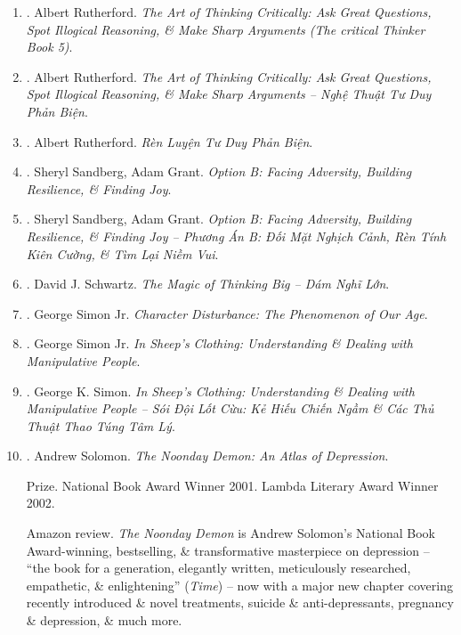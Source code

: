 \documentclass{article}
\begin{document}
\begin{enumerate}
	\item \cite{Rutherford_critical_thinking}. Albert Rutherford. {\it The Art of Thinking Critically: Ask Great Questions, Spot Illogical Reasoning, \& Make Sharp Arguments (The critical Thinker Book 5)}.

	\item \cite{Rutherford_practice_critical_thinking_VN}. Albert Rutherford. {\it The Art of Thinking Critically: Ask Great Questions, Spot Illogical Reasoning, \& Make Sharp Arguments -- Nghệ Thuật Tư Duy Phản Biện}.\hfill{\sf[done]}

	\item \cite{Rutherford_practice_critical_thinking_VN}. Albert Rutherford. {\it Rèn Luyện Tư Duy Phản Biện}.\hfill{\sf[done]}

	\item \cite{Sandberg_Grant2017}. Sheryl Sandberg, Adam Grant. {\it Option B: Facing Adversity, Building Resilience, \& Finding Joy}.\hfill{\sf[reading]}

	\item \cite{Sandberg_Grant2019}. Sheryl Sandberg, Adam Grant. {\it Option B: Facing Adversity, Building Resilience, \& Finding Joy -- Phương Án B: Đối Mặt Nghịch Cảnh, Rèn Tính Kiên Cường, \& Tìm Lại Niềm Vui}.\hfill{\sf[done]}

	\item \cite{Schwartz2019}. David J. Schwartz. {\it The Magic of Thinking Big -- Dám Nghĩ Lớn}.\hfill{\sf[done]}

	\item \cite{Simon_character}. George Simon Jr. {\it Character Disturbance: The Phenomenon of Our Age}.\hfill{\sf[done]}

	\item \cite{Simon_sheep}. George Simon Jr. {\it In Sheep's Clothing: Understanding \& Dealing with Manipulative People}.\hfill{\sf[reading]}

	\item \cite{Simon_sheep_VN}. George K. Simon. {\it In Sheep's Clothing: Understanding \& Dealing with Manipulative People -- Sói Đội Lốt Cừu: Kẻ Hiếu Chiến Ngầm \& Các Thủ Thuật Thao Túng Tâm Lý}.\hfill{\sf[done]}

	\item \cite{Solomon_depression}. {\sc Andrew Solomon}. {\it The Noonday Demon: An Atlas of Depression}.\hfill{\sf[reading]}

	{\sf Prize.} National Book Award Winner 2001. Lambda Literary Award Winner 2002.

	{\sf Amazon review.} {\it The Noonday Demon} is {\sc Andrew Solomon}'s National Book Award-winning, bestselling, \& transformative masterpiece on depression -- ``the book for a generation, elegantly written, meticulously researched, empathetic, \& enlightening'' ({\it Time}) -- now with a major new chapter covering recently introduced \& novel treatments, suicide \& anti-depressants, pregnancy \& depression, \& much more.


\end{enumerate}
\end{document}
